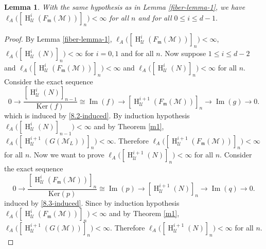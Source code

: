 \documentclass[11pt,reqno]{amsart}
\newtheorem{lemma}[theorem]{Lemma}
\theoremstyle{definition}
\newcommand{\m}{\mathfrak m}
\def\U{{\mathcal U}}
\def\M{{\mathcal M}}
\DeclareMathOperator{\h}{H}
\DeclareMathOperator{\im}{Im}
\numberwithin{equation}{section}
\begin{document}
\begin{lemma}\label{fiber-lemma-3}  With the same hypothesis as in Lemma \ref{fiber-lemma-1}, we have
$\ell_A\Big([\h^i_\mathcal{U}(F_\m(\M))]_n\Big)< \infty$ for all $n$ and for all $ 0\leq i \leq d-1.$
\end{lemma}
\begin{proof}
 By Lemma \ref{fiber-lemma-1}, $\ell_A\Big([\h^i_\U(F_\m(\M))]_n\Big)<\infty$, $\ell_A\Big([\h^i_\U(N)]_n\Big)<\infty$ for $i=0,1$ and for all $ n.$ 
 Now suppose $1\leq i\leq d-2$ and $\ell_A\Big([\h^i_\U(F_\m(\M))]_n\Big)<\infty$ and $\ell_A\Big([\h^i_\U(N)]_n\Big)<\infty$ for all $n$. Consider the exact sequence 
    $$
    0 \to \frac{[ \h^i_{\mathcal{U}}(N)]_{n-1}}{\text{Ker}(f)}\cong \im(f)\to [\h^{i+1}_{\U}(F_\m(\M))]_n\to  \im(g)\to 0.  
    $$
     which is induced by \eqref{8.2-induced}.
     By induction hypothesis $\ell_A\Big([\h^i_{\mathcal{U}}(N)]_{n-1}\Big)< \infty$ and by Theorem \ref{m1}, $\ell_A\Big([\h^{i+1}_{\mathcal{U}}(G(\M_L))]_n\Big)<\infty.$ Therefore $\ell_A\Big([\h^{i+1}_{\U}(F_\m(\M))]_n\Big)<\infty$ for all $n.$ Now we want to prove $\ell_A\Big([\h^{i+1}_{\mathcal{U}}(N)]_{n}\Big)<\infty$ for all $n.$  Consider the exact sequence 
    $$
    0 \to \frac{[ \h^{i}_{\mathcal{U}}(F_\m(\M))]_{n}}{\text{Ker}(p)}\cong \im(p)\to [\h^{i+1}_{\U}(N)]_n\to  \im(q)\to 0.  
    $$
      induced by \eqref{8.3-induced}. 
    Since by induction hypothesis $\ell_A\Big([\h^i_{\mathcal{U}}(F_\m(\M))]_{n}\Big)< \infty$ and by Theorem \ref{m1},  $\ell_A\Big([\h^{i+1}_{\mathcal{U}}(G(\M))]_n\Big)<\infty.$ Therefore $\ell_A\Big([\h^{i+1}_{\U}(N)]_n\Big)<\infty$ for all $n.$
\end{proof}
\end{document}
